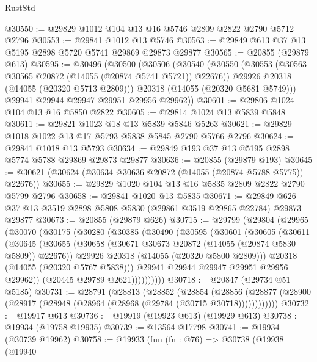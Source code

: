 \begin{lexlean}{RustStd}
\begin{coremodule}
@30550 := @29829 @1012 @104 @13 @16 @5746 @2809 @2822 @2790 @5712 @2796
@30553 := @29841 @1012 @13 @5746
@30563 := @29849 @613 @37 @13 @5195 @2898 @5720 @5741 @29869 @29873 @29877
@30565 := @20855 (@29879 @613)
@30595 := @30496
    (@30500
      (@30506
        (@30540
          (@30550
            (@30553 (@30563 @30565 @20872 (@14055 (@20874 @5741 @5721)) @22676))
            @29926
            @20318
            (@14055 (@20320 @5713 @2809)))
          @20318
          (@14055 (@20320 @5681 @5749)))
        @29941
        @29944
        @29947
        @29951
        @29956
        @29962))
@30601 := @29806 @1024 @104 @13 @16 @5850 @2822
@30605 := @29814 @1024 @13 @5839 @5848
@30611 := @29821 @1023 @18 @13 @5839 @5846 @5263
@30621 := @29829 @1018 @1022 @13 @17 @5793 @5838 @5845 @2790 @5766 @2796
@30624 := @29841 @1018 @13 @5793
@30634 := @29849 @193 @37 @13 @5195 @2898 @5774 @5788 @29869 @29873 @29877
@30636 := @20855 (@29879 @193)
@30645 := @30621 (@30624 (@30634 @30636 @20872 (@14055 (@20874 @5788 @5775)) @22676))
@30655 := @29829 @1020 @104 @13 @16 @5835 @2809 @2822 @2790 @5799 @2796
@30658 := @29841 @1020 @13 @5835
@30671 := @29849 @626 @37 @13 @3519 @2898 @5808 @5830 (@29861 @3519 @29865 @22784) @29873 @29877
@30673 := @20855 (@29879 @626)
@30715 := @29799
    (@29804
      (@29965
        (@30070
          (@30175
            (@30280
              (@30385
                (@30490
                  (@30595
                    (@30601
                      (@30605
                        (@30611
                          (@30645
                            (@30655
                              (@30658 (@30671 @30673 @20872 (@14055 (@20874 @5830 @5809)) @22676))
                              @29926
                              @20318
                              (@14055 (@20320 @5800 @2809)))
                            @20318
                            (@14055 (@20320 @5767 @5838)))
                          @29941
                          @29944
                          @29947
                          @29951
                          @29956
                          @29962))
                      (@20445 @29789 @2621))))))))))
@30718 := @20847 (@29734 @51 @5185)
@30731 := @28791
    (@28813
      (@28852
        (@28854
          (@28856 (@28877 (@28900 (@28917 (@28948 (@28964 (@28968 (@29784 (@30715 @30718))))))))))))
@30732 := @19917 @613
@30736 := @19919 (@19923 @613) (@19929 @613)
@30738 := @19934 (@19758 @19935)
@30739 := @13564 @17798
@30741 := @19934 (@30739 @19962)
@30758 := @19933
    (fun (fn : @76) =>
    @30738
      (@19938
        (@19940

\end{coremodule}
\end{lexlean}
